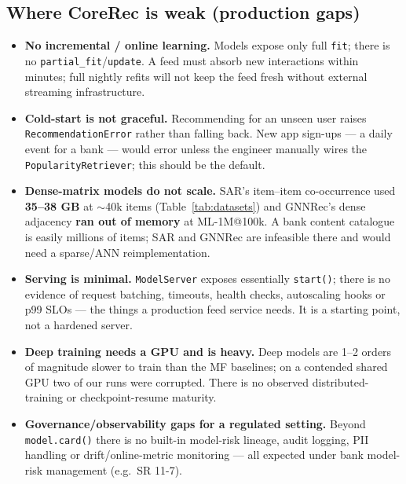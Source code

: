 \documentclass[10pt]{article}
\begin{document}
\subsection*{Where CoreRec is weak (production gaps)}
\begin{itemize}
\item \textbf{No incremental / online learning.} Models expose only full
\texttt{fit}; there is no \texttt{partial\_fit}/\texttt{update}. A feed must absorb
new interactions within minutes; full nightly refits will not keep the feed fresh
without external streaming infrastructure.
\item \textbf{Cold-start is not graceful.} Recommending for an unseen user raises
\texttt{RecommendationError} rather than falling back. New app sign-ups --- a daily
event for a bank --- would error unless the engineer manually wires the
\texttt{PopularityRetriever}; this should be the default.
\item \textbf{Dense-matrix models do not scale.} SAR's item--item co-occurrence
used \textbf{35--38 GB} at $\sim$40k items (Table~\ref{tab:datasets}) and GNNRec's
dense adjacency \textbf{ran out of memory} at ML-1M@100k. A bank content catalogue
is easily millions of items; SAR and GNNRec are infeasible there and would need a
sparse/ANN reimplementation.
\item \textbf{Serving is minimal.} \texttt{ModelServer} exposes essentially
\texttt{start()}; there is no evidence of request batching, timeouts, health
checks, autoscaling hooks or p99 SLOs --- the things a production feed service
needs. It is a starting point, not a hardened server.
\item \textbf{Deep training needs a GPU and is heavy.} Deep models are 1--2 orders
of magnitude slower to train than the MF baselines; on a contended shared GPU two
of our runs were corrupted. There is no observed distributed-training or
checkpoint-resume maturity.
\item \textbf{Governance/observability gaps for a regulated setting.} Beyond
\texttt{model.card()} there is no built-in model-risk lineage, audit logging, PII
handling or drift/online-metric monitoring --- all expected under bank model-risk
management (e.g.\ SR 11-7).
\end{itemize}
\end{document}
